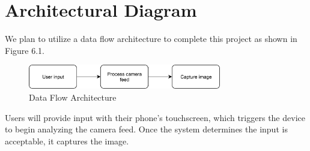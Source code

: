\chapter{Architectural Diagram}

We plan to utilize a data flow architecture to complete this project as shown in Figure 6.1.

\begin{figure}[!h]
    \centering
    \includegraphics[width=0.75\textwidth]{architecturediagram}
    \caption{Data Flow Architecture}
    \label{fig:architecturediagram}
\end{figure}

Users will provide input with their phone's touchscreen, which triggers the device to begin analyzing the camera feed. Once the system determines the input is acceptable, it captures the image.

